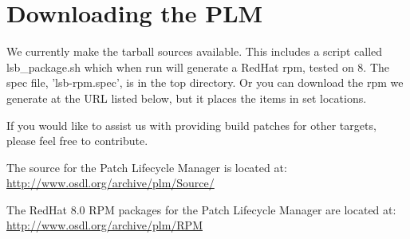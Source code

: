 \section {Downloading the PLM}
We currently make the tarball sources available.  This includes a script called lsb\_package.sh which when run will generate a RedHat rpm, tested on 8.  The spec file, 'lsb-rpm.spec', is in the top directory.  Or you can download the rpm we generate at the URL listed below, but it places the items in set locations. 

If you would like to assist us with providing build patches for other targets, please feel free to contribute.

The source for the Patch Lifecycle Manager is located at:
\url{http://www.osdl.org/archive/plm/Source/}

The RedHat 8.0 RPM packages for the Patch Lifecycle Manager are located at:
\url{http://www.osdl.org/archive/plm/RPM}

